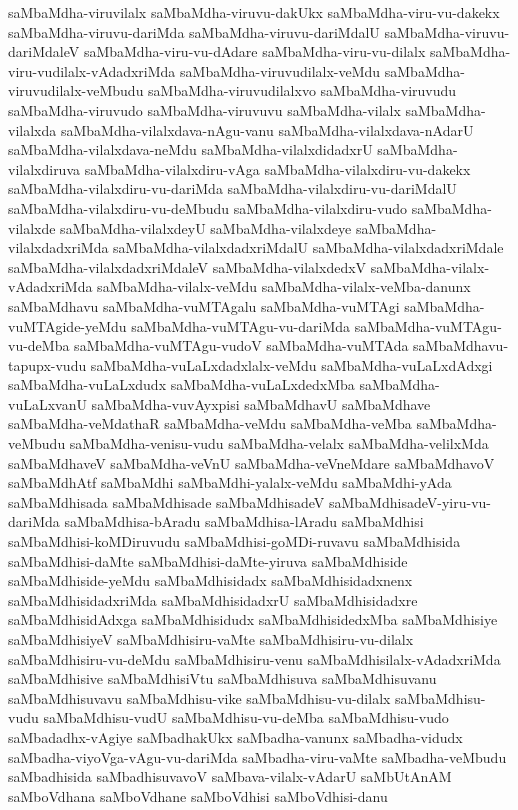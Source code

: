 {saMbaMdha-viruvilalx
saMbaMdha-viruvu-dakUkx
saMbaMdha-viru-vu-dakekx
saMbaMdha-viruvu-dariMda
saMbaMdha-viruvu-dariMdalU
saMbaMdha-viruvu-dariMdaleV
saMbaMdha-viru-vu-dAdare
saMbaMdha-viru-vu-dilalx
saMbaMdha-viru-vudilalx-vAdadxriMda
saMbaMdha-viruvudilalx-veMdu
saMbaMdha-viruvudilalx-veMbudu
saMbaMdha-viruvudilalxvo
saMbaMdha-viruvudu
saMbaMdha-viruvudo
saMbaMdha-viruvuvu
saMbaMdha-vilalx
saMbaMdha-vilalxda
saMbaMdha-vilalxdava-nAgu-vanu
saMbaMdha-vilalxdava-nAdarU
saMbaMdha-vilalxdava-neMdu
saMbaMdha-vilalxdidadxrU
saMbaMdha-vilalxdiruva
saMbaMdha-vilalxdiru-vAga
saMbaMdha-vilalxdiru-vu-dakekx
saMbaMdha-vilalxdiru-vu-dariMda
saMbaMdha-vilalxdiru-vu-dariMdalU
saMbaMdha-vilalxdiru-vu-deMbudu
saMbaMdha-vilalxdiru-vudo
saMbaMdha-vilalxde
saMbaMdha-vilalxdeyU
saMbaMdha-vilalxdeye
saMbaMdha-vilalxdadxriMda
saMbaMdha-vilalxdadxriMdalU
saMbaMdha-vilalxdadxriMdale
saMbaMdha-vilalxdadxriMdaleV
saMbaMdha-vilalxdedxV
saMbaMdha-vilalx-vAdadxriMda
saMbaMdha-vilalx-veMdu
saMbaMdha-vilalx-veMba-danunx
saMbaMdhavu
saMbaMdha-vuMTAgalu
saMbaMdha-vuMTAgi
saMbaMdha-vuMTAgide-yeMdu
saMbaMdha-vuMTAgu-vu-dariMda
saMbaMdha-vuMTAgu-vu-deMba
saMbaMdha-vuMTAgu-vudoV
saMbaMdha-vuMTAda
saMbaMdhavu-tapupx-vudu
saMbaMdha-vuLaLxdadxlalx-veMdu
saMbaMdha-vuLaLxdAdxgi
saMbaMdha-vuLaLxdudx
saMbaMdha-vuLaLxdedxMba
saMbaMdha-vuLaLxvanU
saMbaMdha-vuvAyxpisi
saMbaMdhavU
saMbaMdhave
saMbaMdha-veMdathaR
saMbaMdha-veMdu
saMbaMdha-veMba
saMbaMdha-veMbudu
saMbaMdha-venisu-vudu
saMbaMdha-velalx
saMbaMdha-velilxMda
saMbaMdhaveV
saMbaMdha-veVnU
saMbaMdha-veVneMdare
saMbaMdhavoV
saMbaMdhAtf
saMbaMdhi
saMbaMdhi-yalalx-veMdu
saMbaMdhi-yAda
saMbaMdhisada
saMbaMdhisade
saMbaMdhisadeV
saMbaMdhisadeV-yiru-vu-dariMda
saMbaMdhisa-bAradu
saMbaMdhisa-lAradu
saMbaMdhisi
saMbaMdhisi-koMDiruvudu
saMbaMdhisi-goMDi-ruvavu
saMbaMdhisida
saMbaMdhisi-daMte
saMbaMdhisi-daMte-yiruva
saMbaMdhiside
saMbaMdhiside-yeMdu
saMbaMdhisidadx
saMbaMdhisidadxnenx
saMbaMdhisidadxriMda
saMbaMdhisidadxrU
saMbaMdhisidadxre
saMbaMdhisidAdxga
saMbaMdhisidudx
saMbaMdhisidedxMba
saMbaMdhisiye
saMbaMdhisiyeV
saMbaMdhisiru-vaMte
saMbaMdhisiru-vu-dilalx
saMbaMdhisiru-vu-deMdu
saMbaMdhisiru-venu
saMbaMdhisilalx-vAdadxriMda
saMbaMdhisive
saMbaMdhisiVtu
saMbaMdhisuva
saMbaMdhisuvanu
saMbaMdhisuvavu
saMbaMdhisu-vike
saMbaMdhisu-vu-dilalx
saMbaMdhisu-vudu
saMbaMdhisu-vudU
saMbaMdhisu-vu-deMba
saMbaMdhisu-vudo
saMbadadhx-vAgiye
saMbadhakUkx
saMbadha-vanunx
saMbadha-vidudx
saMbadha-viyoVga-vAgu-vu-dariMda
saMbadha-viru-vaMte
saMbadha-veMbudu
saMbadhisida
saMbadhisuvavoV
saMbava-vilalx-vAdarU
saMbUtAnAM
saMboVdhana
saMboVdhane
saMboVdhisi
saMboVdhisi-danu
}
